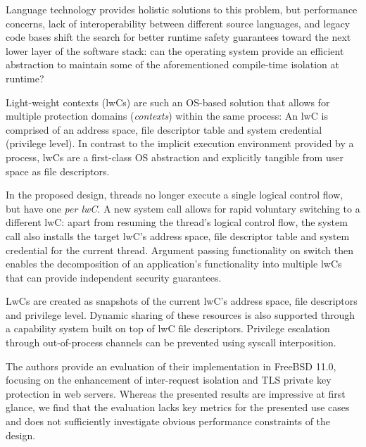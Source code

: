 \documentclass[10pt,twocolumn,a4paper]{article}
\begin{document}
Language technology provides holistic solutions to this problem, but performance concerns, lack of interoperability between different source languages, and legacy code bases shift the search for better runtime safety guarantees toward the next lower layer of the software stack:
can the operating system provide an efficient abstraction to maintain some of the aforementioned compile-time isolation at runtime?

Light-weight contexts (lwCs) are such an OS-based solution that allows for multiple protection domains (\textit{contexts}) within the same process:
An lwC is comprised of an address space, file descriptor table and system credential (privilege level).
In contrast to the implicit execution environment provided by a process, lwCs are a first-class OS abstraction and explicitly tangible from user space as file descriptors.
\cite{lwcpaper}

In the proposed design, threads no longer execute a single logical control flow, but have one \textit{per lwC}.
A new system call allows for rapid voluntary switching to a different lwC: apart from resuming the thread's logical control flow, the system call also installs the target lwC's address space, file descriptor table and system credential for the current thread.
Argument passing functionality on switch then enables the decomposition of an application's functionality into multiple lwCs that can provide independent security guarantees.
\cite{lwcpaper}

LwCs are created as snapshots of the current lwC's address space, file descriptors and privilege level.
Dynamic sharing of these resources is also supported through a capability system built on top of lwC file descriptors.
Privilege escalation through out-of-process channels can be prevented using syscall interposition.
\cite{lwcpaper}

The authors provide an evaluation of their implementation in FreeBSD 11.0, focusing on the enhancement of inter-request isolation and TLS private key protection in web servers.
Whereas the presented results are impressive at first glance, we find that the evaluation lacks key metrics for the presented use cases and does not sufficiently investigate obvious performance constraints of the design.

\end{document}
